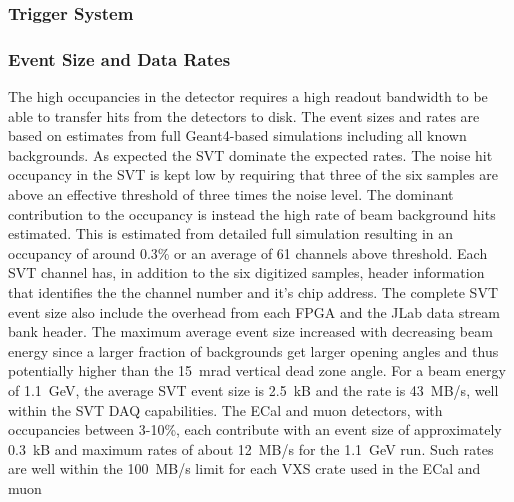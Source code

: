 \subsubsection{Trigger System}
\label{sec:triggerdaq}


\subsubsection{Event Size and Data Rates}

The high occupancies in the detector requires a high readout bandwidth to be able to transfer hits from the 
detectors to disk. The event sizes and rates are based on estimates from full Geant4-based simulations 
including all known backgrounds. As expected the SVT dominate the expected rates. 
The noise hit occupancy in the SVT is kept low by requiring that three of the six samples are above an
effective threshold of three times the noise level. The dominant contribution to the occupancy is instead 
the high rate of beam background hits estimated. This is estimated 
from detailed full simulation resulting in an occupancy of around 0.3\% or an average of 61 channels above threshold.  
Each SVT channel has, in addition to the six digitized samples,  header information that identifies the 
the channel number and it's chip address. The complete SVT event size also 
include the overhead from each FPGA and the JLab data stream bank header.  
The maximum average event size increased with decreasing beam energy since a larger 
fraction of backgrounds get larger opening angles and thus potentially higher than the 15~mrad 
vertical dead zone angle. For a beam energy of 1.1~GeV, the average SVT event size is 2.5~kB and 
the rate is 43~MB/s, well within the SVT DAQ capabilities. 
The ECal and muon detectors, with occupancies between 3-10\%, each contribute with an event size of 
approximately 0.3~kB and maximum rates of about 12~MB/s for the 1.1~GeV run. 
 Such rates are well within the 100~MB/s limit for each VXS crate used in the ECal and muon 
